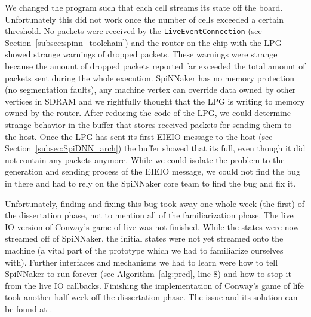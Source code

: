\documentclass[]{article}
\begin{document}
We changed the program such that each cell streams its state off the
board.
Unfortunately this did not work once the number of cells exceeded
a certain threshold.
No packets were received by the \texttt{LiveEventConnection}
(see Section~\ref{subsec:spinn_toolchain}) and the router on the
chip with the LPG showed strange warnings of dropped packets.
These warnings were strange because the amount of dropped packets
reported far exceeded the total amount of packets sent during the
whole execution.
SpiNNaker has no memory protection (no segmentation faults), any
machine vertex can override data owned by other vertices in SDRAM
and we rightfully thought that the LPG is writing to memory owned by
the router.
After reducing the code of the LPG, we could determine strange
behavior in the buffer that stores received packets for sending them
to the host.
Once the LPG has sent its first EIEIO message to the host
(see Section~\ref{subsec:SpiDNN_arch}) the buffer showed that its
full, even though it did not contain any packets anymore.
While we could isolate the problem to the generation and sending
process of the EIEIO message, we could not find the bug in there
and had to rely on the SpiNNaker core team to find the bug and fix it.

Unfortunately, finding and fixing this bug took away one whole week
(the first) of the dissertation phase, not to mention all of the
familiarization phase.
The live IO version of Conway's game of live was not finished.
While the states were now streamed off of SpiNNaker, the initial
states were not yet streamed onto the machine (a vital part of the
prototype which we had to familiarize ourselves with).
Further interfaces and mechanisms we had to learn were how to
tell SpiNNaker to run forever (see Algorithm~\ref{alg:pred}, line 8)
and how to stop it from the live IO callbacks.
Finishing the implementation of Conway's game of life took another
half week off the dissertation phase.
The issue and its solution can be found at \citep{fassbender_2020a}.




\end{document}

